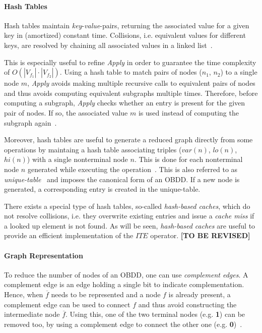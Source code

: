 \documentclass{vldb}
\newcommand{\tbr}{\textbf{[TO BE REVISED]}}
\begin{document}
\paragraph*{Hash Tables}
\mbox{} %

Hash tables maintain \textit{key}-\textit{value}-pairs, returning the associated
value for a given key in (amortized) constant time. Collisions, i.e. equivalent
values for different keys, are resolved by chaining all associated values in a 
linked list~\cite{BRACE90}.

This is especially useful to refine \textit{Apply} in order to guarantee the time
complexity of $O\left(|V_{f_1}| \cdot |V_{f_2}|\right)$. Using a hash table to
match pairs of nodes ($n_1$, $n_2$) to a single node $m$, \textit{Apply} avoids
making multiple recursive calls to equivalent pairs of nodes and thus avoids
computing equivalent subgraphs multiple times. Therefore, before computing a
subgraph, \textit{Apply} checks whether an entry is present for the given pair
of nodes. If so, the associated value $m$ is used instead of computing the
subgraph again~\cite{BRYANT86, BRYANT92}.

Moreover, hash tables are useful to generate a reduced graph directly from some
operations by maintaing a hash table associating triples
($var(n)$, $lo(n)$, $hi(n)$) with a single nonterminal node $n$. This is done for
each nonterminal node $n$ generated while executing the
operation~\cite{BRYANT92}. This is also referred to as
\textit{unique-table}~\cite{BRACE90} and imposes the canonical form of an OBDD. If a
new node is generated, a corresponding entry is created in the unique-table.

There exists a special type of hash tables, so-called
\textit{hash-based caches}, which do not resolve collisions, i.e. they overwrite
existing entries and issue a \textit{cache miss} if a looked up element is not
found. As will be seen, \textit{hash-based caches} are useful to provide an
efficient implementation of the $ITE$ operator. \tbr

\paragraph*{Graph Representation}
\mbox{} %

To reduce the number of nodes of an OBDD, one can use \textit{complement edges}.
A complement edge is an edge holding a single bit to indicate complementation.
Hence, when $\overline{f}$ needs to be represented and a node $f$ is already
present, a complement edge can be used to connect $f$ and thus avoid
constructing the intermediate node $\overline{f}$. Using this, one of the two
terminal nodes (e.g. \textbf{1}) can be removed too, by using a complement edge
to connect the other one (e.g. \textbf{0})~\cite{BRACE90}.
\end{document}
